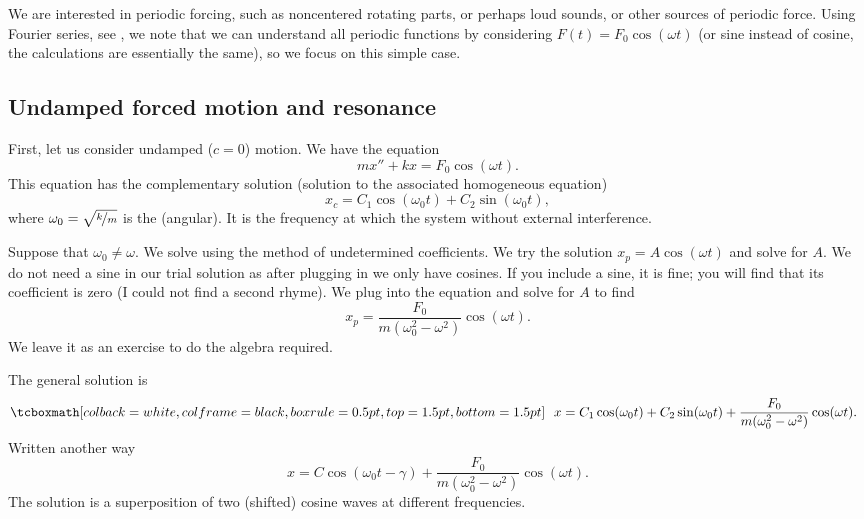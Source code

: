 We are interested in periodic
forcing, such as noncentered rotating parts, or perhaps loud sounds, or
other sources of periodic force.  Using Fourier series, see
, we
note that we can understand all periodic functions
by considering $F(t) = F_0 \cos (\omega t)$ (or sine instead of cosine,
the calculations are essentially the same), so we focus on this simple case.

\subsection{Undamped forced motion and resonance}

First, let us consider undamped ($c=0$) motion.
We have the equation
\begin{equation*}
mx'' + kx = F_0 \cos (\omega t) .
\end{equation*}
This equation has the complementary solution (solution to the associated homogeneous
equation)
\begin{equation*}
x_c = C_1 \cos (\omega_0 t) + C_2 \sin (\omega_0 t) ,
\end{equation*}
where $\omega_0 = \sqrt{\nicefrac{k}{m}}$ is the
\emph{} (angular).  It is the frequency
at which the system  without external interference.

Suppose that $\omega_0 \neq \omega$.
We solve using the method of undetermined coefficients.
We try the solution
$x_p = A \cos (\omega t)$ and solve for $A$.  We do not need a sine
in our trial solution as after plugging in we only have cosines.
If you include a sine, it is fine; you will find that its
coefficient is zero (I could not find a second rhyme).
We plug into the equation and solve for $A$ to find
\begin{equation*}
x_p = \frac{F_0}{m(\omega_0^2 - \omega^2)} \cos (\omega t) .
\end{equation*}
We leave it as an exercise to do the algebra required.

The general solution is
\begin{equation*}
\mybxbg{
~~
x = C_1 \cos (\omega_0 t) + C_2 \sin (\omega_0 t) +
\frac{F_0}{m(\omega_0^2 - \omega^2)} \cos (\omega t) .
~~
}
\end{equation*}
Written another way
\begin{equation*}
x = C \cos (\omega_0 t - \gamma) +
\frac{F_0}{m(\omega_0^2 - \omega^2)} \cos (\omega t) .
\end{equation*}
The solution is a superposition of two (shifted) cosine waves at different frequencies.
\pagebreak[2]

